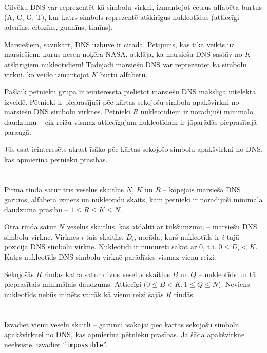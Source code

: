 \ifx\boi\undefined\fi
\def\version{jury-1}
Cilvēku DNS var reprezentēt kā simbolu virkni,
izmantojot četrus alfabēta burtus ({A, C, G, T}), kur katrs simbols reprezentē
atšķirīgus nukleotīdus (attiecīgi -- adenīns, citozīns, guanīns, timīns).

Marsiešiem, savukārt, DNS uzbūve ir citāda. Pētījums, kas tika veikts
uz marsiešiem, kurus nesen noķēra NASA, atklāja, ka marsiešu DNS sastāv no
$K$ atšķirīgiem nukleotīdiem! Tādējādi marsiešu DNS var reprezentēt kā
simbolu virkni, ko veido izmantojot $K$ burtu alfabētu.

Pašlaik pētnieku grupa ir ieinteresēta pielietot marsiešu DNS
mākslīgā intelekta izveidē. Pētnieki ir pieprasījuši pēc kārtas sekojošu simbolu
apakšvirkni no marsiešu DNS simbolu virknes. Pētnieki $R$ nukleotīdiem ir norādījuši
minimālo daudzumu -- cik reižu vismaz attiecīgajam nukleotīdam ir jāparādās
pieprasītajā paraugā.

Jūs esat ieinteresēts atrast īsāko pēc kārtas sekojošo simbolu apakšvirkni no DNS, kas apmierina pētnieku prasības.

\section*{}
Pirmā rinda satur trīs veselus skaitļus $N$, $K$ un $R$ --
kopējais marsieša DNS garums, alfabēta izmērs un
nukleotīdu skaits, kam pētnieki ir norādījuši minimālā daudzuma
prasību -- $1 \le R \le K \le N$.

Otrā rinda satur $N$ veselus skaitļus, kas atdalīti ar tukšumzīmi, -- marsiešu
DNS simbolu virkne. Virknes $i$-tais skaitlis, $D_i$, norāda, kurš nukleotīds
ir $i$-tajā pozīcijā DNS simbolu virknē. Nukleotīdi ir numurēti sākot ar $0$, t.i.
$0 \leq D_i < K$. Katrs nukleotīds DNS simbolu virknē parādīsies vismaz vienu reizi.

Sekojošās $R$ rindas katra satur divus veselus skaitļus $B$ un $Q$ --
nukleotīds un tā pieprasītais minimālais daudzums. Attiecīgi ($0 \le B < K, 1 \le Q \le N$).
Neviens nukleotīds nebūs minēts vairāk kā vienu reizi šajās $R$ rindās.

\section*{\outputsection}
Izvadiet vienu veselu skaitli -- garumu īsākajai pēc kārtas sekojošu simbolu apakšvirknei
no DNS, kas apmierina pētnieku prasības. Ja šāda apakšvirkne
neeksistē, izvadiet ``\texttt{impossible}''.

